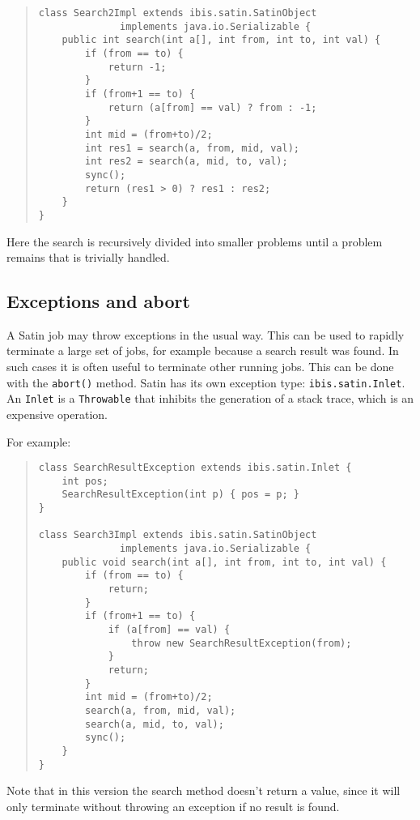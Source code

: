 \documentclass[10pt]{article}
\newcommand{\mysubsection}[1]{\subsection{#1}\label{#1}}
\begin{document}
\begin{quote}
\begin{verbatim}
class Search2Impl extends ibis.satin.SatinObject
              implements java.io.Serializable {
    public int search(int a[], int from, int to, int val) {
        if (from == to) {
            return -1;
        }
        if (from+1 == to) {
            return (a[from] == val) ? from : -1;
        }
        int mid = (from+to)/2;
        int res1 = search(a, from, mid, val);
        int res2 = search(a, mid, to, val);
        sync();
        return (res1 > 0) ? res1 : res2;
    }
}
\end{verbatim}
\end{quote}
\noindent
Here the search is recursively divided into smaller problems until
a problem remains that is trivially handled.

\mysubsection{Exceptions and abort}

A Satin job may throw exceptions in the usual way. This can be used
to rapidly terminate a large set of jobs, for example because a search
result was found. In such cases it is often useful to terminate other
running jobs.  This can be done with the \texttt{abort()} method.  Satin has
its own exception type: \texttt{ibis.satin.Inlet}.  An \texttt{Inlet} is a
\texttt{Throwable} that inhibits the generation of a stack trace, which
is an expensive operation.

For example:

\begin{quote}
\begin{verbatim}
class SearchResultException extends ibis.satin.Inlet {
    int pos;
    SearchResultException(int p) { pos = p; }
}

class Search3Impl extends ibis.satin.SatinObject
              implements java.io.Serializable {
    public void search(int a[], int from, int to, int val) {
        if (from == to) {
            return;
        }
        if (from+1 == to) {
            if (a[from] == val) {
                throw new SearchResultException(from);
            }
            return;
        }
        int mid = (from+to)/2;
        search(a, from, mid, val);
        search(a, mid, to, val);
        sync();
    }
}
\end{verbatim}
\end{quote}

\noindent
Note that in this version the search method doesn't return a value,
since it will only terminate without throwing an exception if no
result is found.
\end{document}
